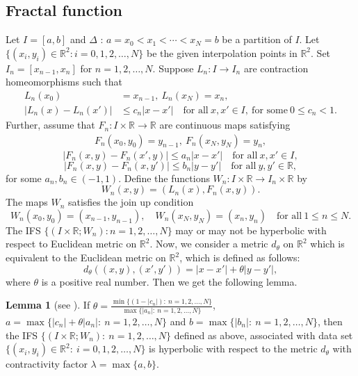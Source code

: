 \documentclass[10pt]{amsart}
\theoremstyle{definition}
\newtheorem{lm}{Lemma}[section]
\newcommand{\myseries}[3]{#1\leq #2\leq #3}
\begin{document}
	\subsection{Fractal function} Let $I=[a,b]$ and $\Delta$ : $a=x_0<x_1<\cdots<x_N=b$ be a partition of $I$. Let $\{(x_i,y_i)\in\mathbb{R}^2:i=0,1,2,\ldots,N\}$ be the given interpolation points in $\mathbb{R}^2$. Set $I_n=[x_{n-1},x_n]$ for $n=1,2,\ldots,N$. Suppose $L_n:I\rightarrow I_n$ are contraction homeomorphisms such that 
	\begin{align}
		\label{lmaps}
		L_n(x_0)&=x_{n-1},~L_n(x_N)=x_n,\\ 
		|L_n(x)-L_n(x')|&\leq c_n|x-x'|\quad\mbox{for all}~ x,x'\in I,~\mbox{for some}~0\leq c_n<1.
	\end{align}
	Further, assume that $F_n:I\times\mathbb{R}\rightarrow\mathbb{R}$ are continuous maps satisfying
	\begin{align}
		F_n(x_0,y_0)=y_{n-1},~F_n(x_N,y_N)=y_n,
		\label{fnmaps}
	\end{align} 
	$$|F_n(x,y)-F_n(x',y)|\leq a_n|x-x'|\quad\mbox{for all}~ x,x'\in I,$$
	$$|F_n(x,y)-F_n(x,y')|\leq b_n|y-y'|\quad\mbox{for all}~ y,y'\in\mathbb{R},$$
	for some $a_n,b_n\in(-1,1)$. Define the functions $W_n:I\times\mathbb{R}\rightarrow I_n\times\mathbb{R}$ by 
	$$W_n(x,y)=(L_n(x),F_n(x,y)).$$ The maps $W_n$ satisfies the join up condition 
	$$W_n(x_0,y_0)=(x_{n-1},y_{n-1}),\quad W_n(x_N,y_N)=(x_n,y_n)\quad\mbox{for all}~\myseries{1}{n}{N}.$$
	The IFS $\{(I\times\mathbb{R};W_n):n=1,2,\ldots,N\}$ may or may not be hyperbolic with respect to Euclidean metric on $\mathbb{R}^2$. Now, we consider a metric $d_{\theta}$ on $\mathbb{R}^2$ which is equivalent to the Euclidean metric on $\mathbb{R}^2$, which is defined as follows:
	$$d_{\theta}((x,y),(x',y'))=\lvert x-x'\rvert+\theta\lvert y-y'\rvert,$$ where $\theta$ is a positive real number. Then we get the following lemma.
	\begin{lm}[see \cite{FE}]
		If $\theta=\frac{\min\{(1-|c_n|):~n=1,2,\ldots,N\}}{\max\{|a_n|:~n=1,2,\ldots,N\}}$, $a=\max\{|c_n|+\theta|a_n|:~n=1,2,\ldots,N\}$ and $b=\max\{|b_n|:~n=1,2,\ldots,N\}$, then the IFS $\{(I\times\mathbb{R};W_n):~n=1,2,\ldots,N\}$ defined as above, associated with data set $\{(x_i,y_i)\in\mathbb{R}^2:~i=0,1,2,\ldots,N\}$ is hyperbolic with respect to the metric $d_{\theta}$ with contractivity factor $\lambda=\max\{a,b\}$. \label{contlm}	
	\end{lm}
	
\end{document}
